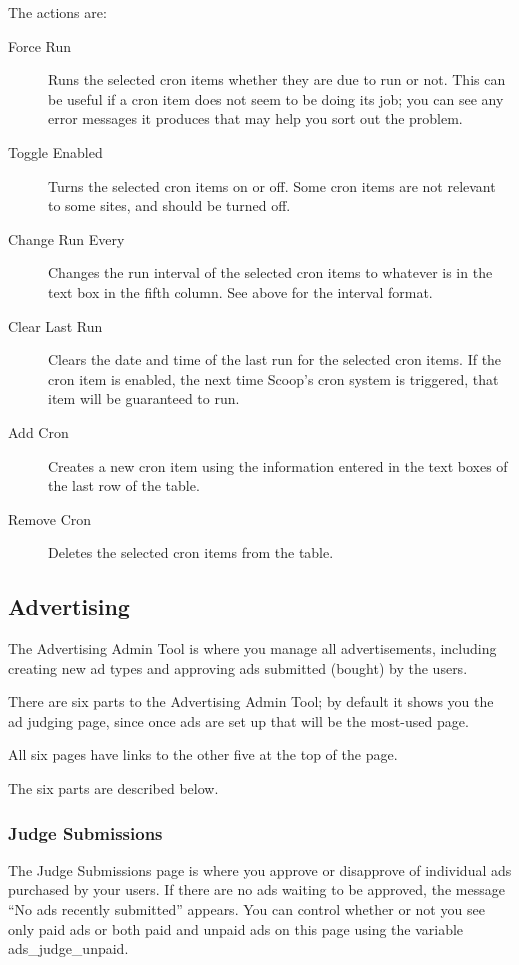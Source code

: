 The actions are:
\begin{description}
\item[Force Run] Runs the selected cron items whether they are due to run or not.  This can be useful if a cron item does not seem to be doing its job; you can see any error messages it produces that may help you sort out the problem.
\item[Toggle Enabled] Turns the selected cron items on or off.  Some cron items are not relevant to some sites, and should be turned off.
\item[Change Run Every] Changes the run interval of the selected cron items to whatever is in the text box in the fifth column.  See above for the interval format.
\item[Clear Last Run] Clears the date and time of the last run for the selected cron items.  If the cron item is enabled, the next time Scoop's cron system is triggered, that item will be guaranteed to run.
\item[Add Cron] Creates a new cron item using the information entered in the text boxes of the last row of the table.
\item[Remove Cron] Deletes the selected cron items from the table.
\end{description}

\subsection{Advertising}
\label{admin-tools-advertising}

The Advertising Admin Tool is where you manage all advertisements, including creating new ad types and approving ads submitted (bought) by the users.

There are six parts to the Advertising Admin Tool; by default it shows you the ad judging page, since once ads are set up that will be the most-used page.

All six pages have links to the other five at the top of the page.

The six parts are described below.

\subsubsection{Judge Submissions}

The Judge Submissions page is where you approve or disapprove of individual ads purchased by your users.  If there are no ads waiting to be approved, the message ``No ads recently submitted'' appears.  You can control whether or not you see only paid ads or both paid and unpaid ads on this page using the variable ads\_judge\_unpaid.

